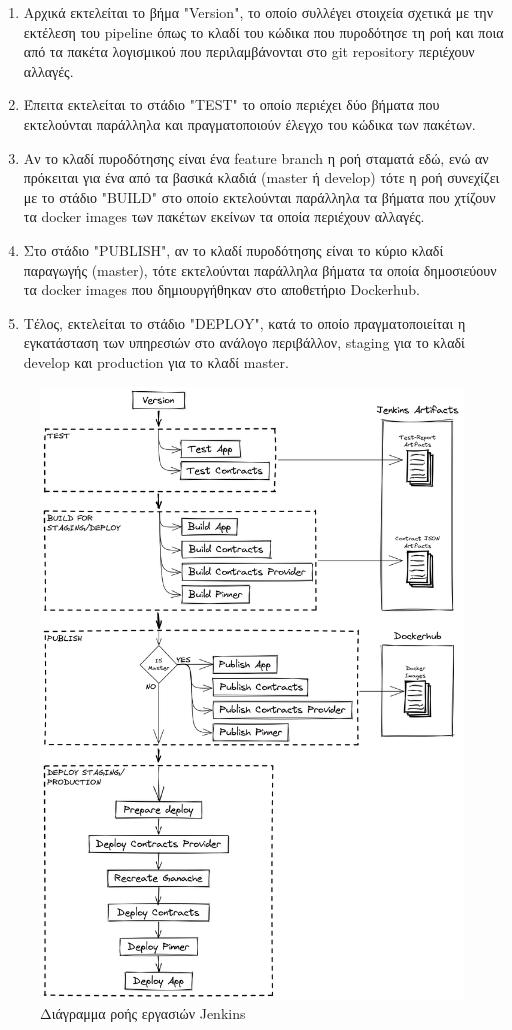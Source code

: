 \begin{enumerate}
    \item Αρχικά εκτελείται το βήμα "Version", το οποίο συλλέγει στοιχεία σχετικά με την εκτέλεση του pipeline όπως το κλαδί του κώδικα που πυροδότησε τη ροή και ποια από τα πακέτα λογισμικού που περιλαμβάνονται στο git repository περιέχουν αλλαγές.
    \item Έπειτα εκτελείται το στάδιο "TEST" το οποίο περιέχει δύο βήματα που εκτελούνται παράλληλα και πραγματοποιούν έλεγχο του κώδικα των πακέτων.
    \item Αν το κλαδί πυροδότησης είναι ένα feature branch η ροή σταματά εδώ, ενώ αν πρόκειται για ένα από τα βασικά κλαδιά (master ή develop) τότε η ροή συνεχίζει με το στάδιο "BUILD" στο οποίο εκτελούνται παράλληλα τα βήματα που χτίζουν τα docker images των πακέτων εκείνων τα οποία περιέχουν αλλαγές.
    \item Στο στάδιο "PUBLISH", αν το κλαδί πυροδότησης είναι το κύριο κλαδί παραγωγής (master), τότε εκτελούνται παράλληλα βήματα τα οποία δημοσιεύουν τα docker images που δημιουργήθηκαν στο αποθετήριο Dockerhub.
    \item Τέλος, εκτελείται το στάδιο "DEPLOY", κατά το οποίο πραγματοποιείται η εγκατάσταση των υπηρεσιών στο ανάλογο περιβάλλον, staging για το κλαδί develop και production για το κλαδί master.
\end{enumerate}

\begin{figure}[H]
    \centering
    \includegraphics[width=.8\textwidth]{assets/figures/chapter-4/4-2-implementation-methodology-jenkins-pipeline.png}
    \caption{Διάγραμμα ροής εργασιών Jenkins}
    \label{figure:4.2.implementation-methodology-jenkins-pipeline}
\end{figure}

